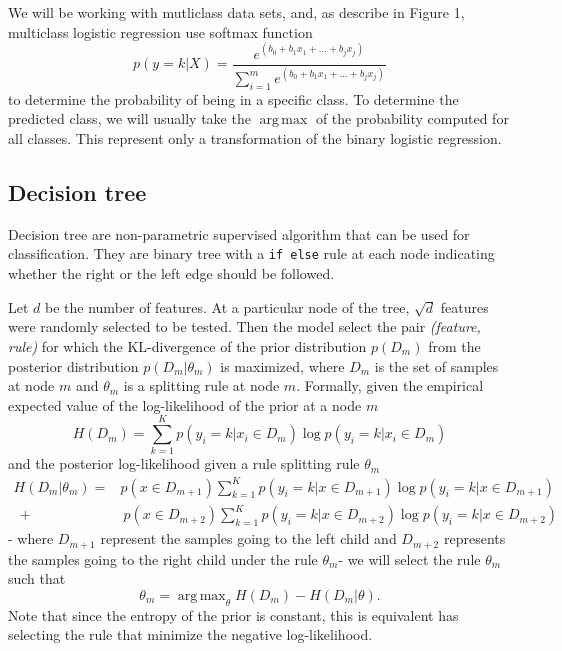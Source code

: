 \documentclass{article}
\DeclareMathOperator*{\argmax}{arg\,max}
\begin{document}

We will be working with mutliclass data sets, and, as describe in Figure 1, multiclass logistic regression use softmax function 
\[
    p(y=k|X) = \frac{e^{(b_{0}+b_{1}x_{1}+...+b_{j} x_j)}}{\sum_{i=1}^me^{(b_{0}+b_{1}x_{1}+...+b_{j}x_j)}}
\]
to determine the probability of being in a specific class. To determine the predicted class, we will usually take the $\argmax$ of the probability computed for all classes. This represent only a transformation of the binary logistic regression.

\subsection{Decision tree} Decision tree are non-parametric supervised algorithm that can be used for classification. They are binary tree with a \texttt{if else} rule at each node indicating whether the right or the left edge should be followed. 

Let $d$ be the number of features. At a particular node of the tree, $\sqrt{d}$ features were randomly selected to be tested. Then the model select the pair \emph{(feature, rule)} for which the KL-divergence of the prior distribution $p(D_m)$ from the posterior distribution $p(D_m|\theta_m)$ is maximized, where $D_m$ is the set of samples at node $m$ and $\theta_m$ is a splitting rule at node $m$. Formally, given the empirical expected value of the log-likelihood of the prior at a node $m$
\begin{equation}
    H(D_m)=\sum_{k=1}^K p(y_i = k | x_i \in D_m) \log p(y_i = k | x_i \in D_m)
\end{equation}
and the posterior log-likelihood given a rule splitting rule $\theta_m$
\begin{align}
    H(D_m|\theta_m)
    =&p(x\in D_{m+1})\sum_{k=1}^K p(y_i = k | x\in D_{m+1}) \log p(y_i = k | x\in D_{m+1}) \\
    ~~+&~ p(x\in D_{m+2})\sum_{k=1}^K p(y_i = k | x\in D_{m+2}) \log p(y_i = k | x\in D_{m+2}) 
\end{align}
- where $D_{m+1}$ represent the samples going to the left child and $D_{m+2}$ represents the samples going to the right child under the rule $\theta_m$- we will select the rule $\theta_m$ such that
\begin{equation}
    \theta_m = \argmax_{\theta} H(D_m)-H(D_m|\theta).
\end{equation}
Note that since the entropy of the prior is constant, this is equivalent has selecting the rule that minimize the negative log-likelihood.
\end{document}
